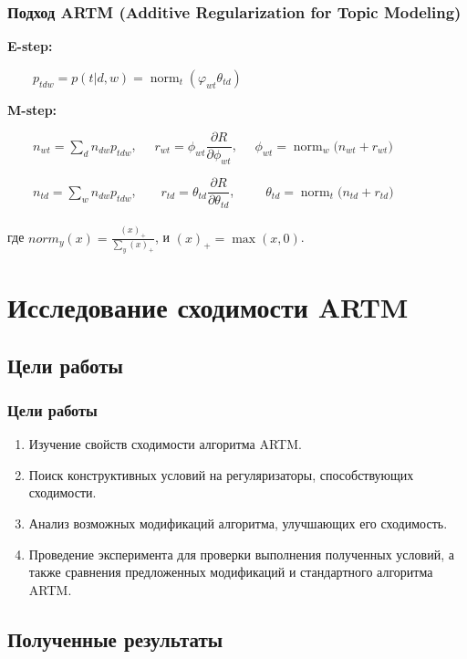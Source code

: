 \documentclass[utf8]{beamer}
\DeclareMathOperator{\norm}{norm}
\begin{document}
 
		\begin{frame}
		\frametitle{Подход ARTM (Additive Regularization for Topic Modeling)}   
   \textbf{E-step:}
    
    \ \ \ \ $p_{tdw} = p(t|d, w) = \norm_t(\varphi_{wt} \theta_{td})$

    \medskip\textbf{M-step:}
    
    \ \ \ \ $n_{wt} = \sum\limits_{d} n_{dw} p_{tdw}$,\ \ \ $r_{wt} =  \phi_{wt}\dfrac{\partial R}{\partial\phi_{wt}}$,\ \ \  $\phi_{wt}   = \norm_w\big(n_{wt} + r_{wt}\big)$

\ \ \ \ $n_{td} = \sum\limits_{w} n_{dw} p_{tdw}$,\ \ \  \ $r_{td} =  \theta_{td}\dfrac{\partial R}{\partial\theta_{td}}$,\ \ \ \ \ $\theta_{td} = \norm_t  \big(n_{td} + r_{td}\big)$
    \ \\
    \ \\
	где $norm_y(x) = \frac{(x)_{+}}{\sum\limits_y (x)_{+}}$, и $(x)_{+} = \max(x, 0)$.


	\end{frame}

	\section{Исследование сходимости ARTM}
	\subsection{Цели работы}
	
	\begin{frame}
		\frametitle{Цели работы}

\begin{enumerate}
\item Изучение свойств сходимости алгоритма ARTM. 
\item Поиск конструктивных условий на регуляризаторы, способствующих сходимости.
\item Анализ возможных модификаций алгоритма, улучшающих его сходимость.
\item Проведение эксперимента для проверки выполнения полученных условий, а также сравнения предложенных модификаций и стандартного алгоритма ARTM.
\end{enumerate}
	\end{frame}

	\subsection{Полученные результаты}
	
\end{document}
